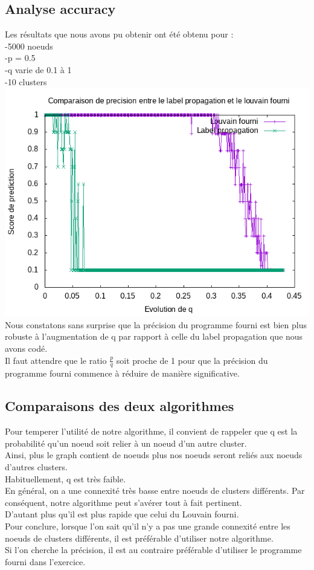 \documentclass[a4paper,10pt]{report}
\begin{document}
\subsection{Analyse accuracy}
Les résultats que nous avons pu obtenir ont été obtenu pour :\\
-5000 noeuds\\
-p = 0.5\\
-q varie de 0.1 à 1\\
-10 clusters\\
\includegraphics[scale=0.5]{./Datas/evalScoreLabelLouvain.png}
\\
Nous constatons sans surprise que la précision du programme fourni est bien plus robuste à l'augmentation de q par rapport à celle du label propagation que nous avons codé.\\
Il faut attendre que le ratio $\frac{p}{q}$ soit proche de 1 pour que la précision du programme fourni commence à réduire de manière significative.
\\
\subsection{Comparaisons des deux algorithmes}
Pour temperer l'utilité de notre algorithme, il convient de rappeler que q est la probabilité qu'un noeud soit relier à un noeud d'un autre cluster.
\\
Ainsi, plus le graph contient de noeuds plus nos noeuds seront reliés aux noeuds d'autres clusters.
\\
Habituellement, q est très faible.
\\
En général, on a une connexité très basse entre noeuds de clusters différents. Par conséquent, notre algorithme peut s'avérer tout à fait pertinent. 
\\
D'autant plus qu'il est plus rapide que celui du Louvain fourni.
\\
Pour conclure, lorsque l'on sait qu'il n'y a pas une grande connexité entre les noeuds de clusters différents, il est préférable d'utiliser notre algorithme.
\\
Si l'on cherche la précision, il est au contraire préférable d'utiliser le programme fourni dans l'exercice.
\\
\end{document}
